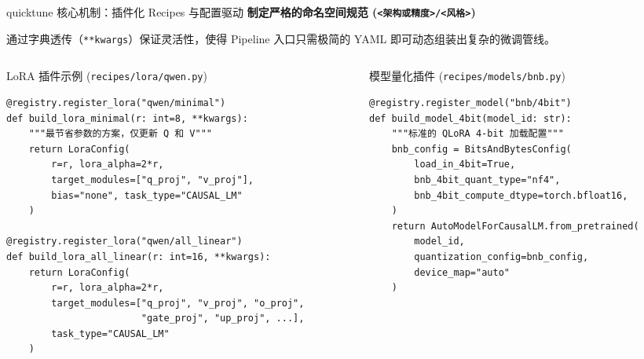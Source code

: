 \documentclass[aspectratio=169]{beamer}
\providecommand{\paragraph}[1]{\smallskip\textbf{#1}\par}
\begin{document}
\begin{frame}[fragile]{quicktune 核心机制：插件化 Recipes 与配置驱动}
  \paragraph{制定严格的命名空间规范 (\texttt{<架构或精度>/<风格>})}
  通过字典透传（\texttt{**kwargs}）保证灵活性，使得 Pipeline 入口只需极简的 YAML 即可动态组装出复杂的微调管线。

  \begin{columns}[T]
    \begin{column}{0.48\textwidth}
      \begin{block}{LoRA 插件示例 (\texttt{recipes/lora/qwen.py})}
\begin{verbatim}
@registry.register_lora("qwen/minimal")
def build_lora_minimal(r: int=8, **kwargs):
    """最节省参数的方案，仅更新 Q 和 V"""
    return LoraConfig(
        r=r, lora_alpha=2*r,
        target_modules=["q_proj", "v_proj"],
        bias="none", task_type="CAUSAL_LM"
    )
    
@registry.register_lora("qwen/all_linear")
def build_lora_all_linear(r: int=16, **kwargs):
    return LoraConfig(
        r=r, lora_alpha=2*r,
        target_modules=["q_proj", "v_proj", "o_proj", 
                        "gate_proj", "up_proj", ...],
        task_type="CAUSAL_LM"
    )
\end{verbatim}
      \end{block}
    \end{column}

    \begin{column}{0.48\textwidth}
      \begin{block}{模型量化插件 (\texttt{recipes/models/bnb.py})}
\begin{verbatim}
@registry.register_model("bnb/4bit")
def build_model_4bit(model_id: str):
    """标准的 QLoRA 4-bit 加载配置"""
    bnb_config = BitsAndBytesConfig(
        load_in_4bit=True,
        bnb_4bit_quant_type="nf4",
        bnb_4bit_compute_dtype=torch.bfloat16,
    )
    return AutoModelForCausalLM.from_pretrained(
        model_id,
        quantization_config=bnb_config,
        device_map="auto"
    )
\end{verbatim}
      \end{block}
    \end{column}
  \end{columns}
\end{frame}
\end{document}
